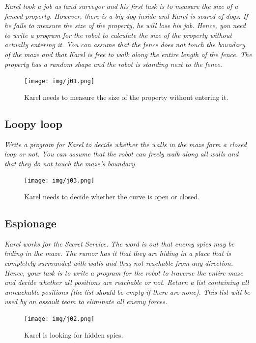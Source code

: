 \noindent
{\em Karel took a job as land surveyor and his first task is to measure the size of a fenced property. However, there is a big dog inside and Karel is scared of dogs. If he fails to measure the size of the property, he will lose his job. Hence, you need to write a program for the robot to calculate the size of the property without actually entering it. You can assume that the fence does not touch the boundary of the maze and that Karel is free to walk along the entire length of the fence. The property has a random shape and the robot is standing next to the fence.}

\begin{figure}[!ht]
\begin{center}
\texttt{[image: img/j01.png]}
\end{center}
\vspace{-4mm}
\caption{Karel needs to measure the size of the property without entering it.}
\label{fig:j01}
\end{figure}

\newpage
\subsection{Loopy loop}

\noindent
{\em Write a program for Karel to decide whether the walls in the maze form a closed loop or not. You can assume that the robot can freely walk along all walls and that they do not touch the maze's boundary.  }

\begin{figure}[!ht]
\begin{center}
\texttt{[image: img/j03.png]}
\end{center}
\vspace{-4mm}
\caption{Karel needs to decide whether the curve is open or closed.}
\label{fig:j03}
\end{figure}


\newpage
\subsection{Espionage}

\noindent
{\em Karel works for the Secret Service. The word is out that 
enemy spies may be hiding in the maze. The rumor has it that they are 
hiding in a place that is completely surrounded with walls and thus 
not reachable from any direction. Hence, your task is to write a program 
for the robot to traverse the entire maze and decide whether all positions 
are reachable or not. Return a list containing all unreachable positions 
(the list should be empty if there are none). This list will be used by 
an assault team to eliminate all enemy forces.}

\begin{figure}[!ht]
\begin{center}
\texttt{[image: img/j02.png]}
\end{center}
\vspace{-4mm}
\caption{Karel is looking for hidden spies.}
\label{fig:j02}
\end{figure}
\noindent
